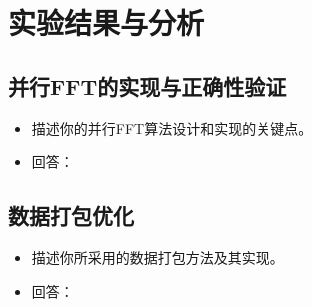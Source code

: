 \documentclass{SYSUReport}
\begin{document}
\section{实验结果与分析}
\subsection{并行FFT的实现与正确性验证}
\begin{itemize}
    \item 描述你的并行FFT算法设计和实现的关键点。
    \item 回答：
\end{itemize}

\subsection{数据打包优化}
\begin{itemize}
    \item 描述你所采用的数据打包方法及其实现。
    \item 回答：
\end{itemize}
\end{document}
